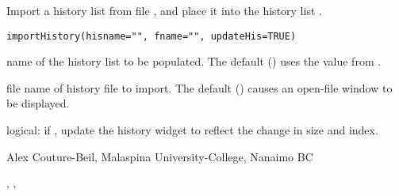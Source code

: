 \documentclass[letterpaper]{book}
\begin{document}
\begin{Description}\relax
Import a history list from file , and place it 
into the history list .
\end{Description}
\begin{Usage}
\begin{verbatim}
importHistory(hisname="", fname="", updateHis=TRUE)
\end{verbatim}
\end{Usage}
\begin{Arguments}
\begin{ldescription}
\item[\code{hisname}] name of the history list to be populated. 
The default () uses the value from .
\item[\code{fname}] file name of history file to import. 
The default () causes an open-file window to be displayed.
\item[\code{updateHis}] logical: if , update the history widget to reflect the change
in size and index.
\end{ldescription}
\end{Arguments}
\begin{Author}\relax
Alex Couture-Beil, Malaspina University-College, Nanaimo BC
\end{Author}
\begin{SeeAlso}\relax
{}, , 
\end{SeeAlso}
\end{document}
